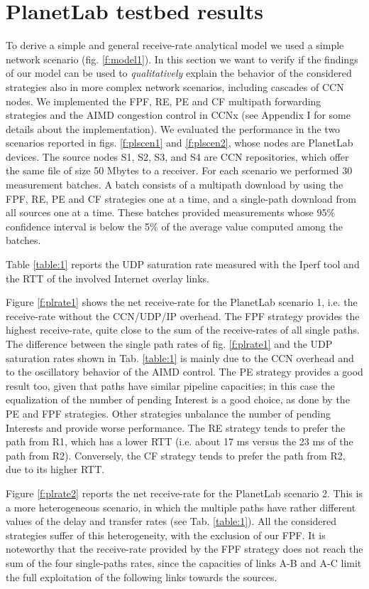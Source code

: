 \documentclass{sig-alternate-10pt}
\begin{document}
\section{PlanetLab testbed results}
To derive a simple and general receive-rate analytical model we used a simple network scenario (fig. \ref{f:model1}). In this section we want to verify if the findings of our model can be used to \emph{qualitatively} explain the behavior of the considered strategies also in more complex network scenarios, including cascades of CCN nodes.     
We implemented the FPF, RE, PE and CF multipath forwarding strategies and the AIMD congestion control in CCNx (see Appendix I for some details about the implementation). We evaluated the performance in the two scenarios reported in figs. \ref{f:plscen1} and \ref{f:plscen2}, whose nodes are PlanetLab devices. The source nodes S1, S2, S3, and S4 are CCN repositories, which offer the same file of size 50 Mbytes to a receiver. For each scenario we performed 30 measurement batches. A batch consists of a multipath download by using the FPF, RE, PE and CF strategies one at a time, and a single-path download from all sources one at a time. These batches provided measurements whose 95\% confidence interval is below the 5\% of the average value computed among the batches. 

Table \ref{table:1} reports the UDP saturation rate measured with the Iperf tool and the RTT of the involved Internet overlay links.

Figure \ref{f:plrate1} shows the net receive-rate for the PlanetLab scenario 1, i.e. the receive-rate without the CCN/UDP/IP overhead. The FPF strategy provides the highest receive-rate, quite close to the sum of the receive-rates of all single paths. The difference between the single path rates of fig. \ref{f:plrate1} and the UDP saturation rates shown in Tab. \ref{table:1} is mainly due to the CCN overhead and to the oscillatory behavior of the AIMD control. The PE strategy provides a good result too, given that paths have similar pipeline capacities; in this case the equalization of the number of pending Interest is a good choice, as done by the PE and FPF strategies. Other strategies unbalance the number of pending Interests and provide worse performance. The RE strategy tends to prefer the path from R1, which has a lower RTT (i.e. about 17 ms versus the 23 ms of the path from R2). Conversely, the CF strategy tends to prefer the path from R2, due to its higher RTT.

Figure \ref{f:plrate2} reports the net receive-rate for the PlanetLab scenario 2. This is a more heterogeneous scenario, in which the multiple paths have rather different values of the delay and transfer rates (see Tab. \ref{table:1}). All the considered strategies suffer of this heterogeneity, with the exclusion of our FPF. It is noteworthy that the receive-rate provided by the FPF strategy does not reach the sum of the four single-paths rates, since the capacities of links A-B and A-C limit the full exploitation of the following links towards the sources.
\end{document}
